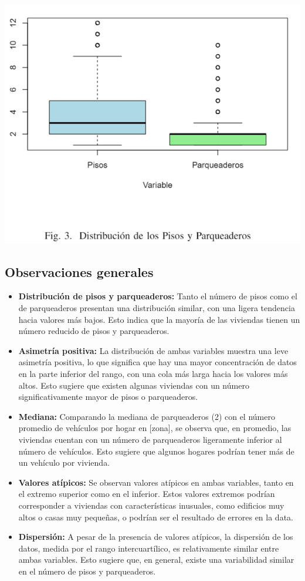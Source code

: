 \documentclass[conference,final,]{IEEEtran}
\begin{document}
\includegraphics[width=1\linewidth]{images/BoxplotViviendaParqueadero}

\subsection{\textbf{Observaciones generales}}

\begin{itemize}
\item
  \textbf{Distribución de pisos y parqueaderos:} Tanto el número de
  pisos como el de parqueaderos presentan una distribución similar, con
  una ligera tendencia hacia valores más bajos. Esto indica que la
  mayoría de las viviendas tienen un número reducido de pisos y
  parqueaderos.
\item
  \textbf{Asimetría positiva:} La distribución de ambas variables
  muestra una leve asimetría positiva, lo que significa que hay una
  mayor concentración de datos en la parte inferior del rango, con una
  cola más larga hacia los valores más altos. Esto sugiere que existen
  algunas viviendas con un número significativamente mayor de pisos o
  parqueaderos.
\item
  \textbf{Mediana:} Comparando la mediana de parqueaderos (2) con el
  número promedio de vehículos por hogar en {[}zona{]}, se observa que,
  en promedio, las viviendas cuentan con un número de parqueaderos
  ligeramente inferior al número de vehículos. Esto sugiere que algunos
  hogares podrían tener más de un vehículo por vivienda.
\item
  \textbf{Valores atípicos:} Se observan valores atípicos en ambas
  variables, tanto en el extremo superior como en el inferior. Estos
  valores extremos podrían corresponder a viviendas con características
  inusuales, como edificios muy altos o casas muy pequeñas, o podrían
  ser el resultado de errores en la data.
\item
  \textbf{Dispersión:} A pesar de la presencia de valores atípicos, la
  dispersión de los datos, medida por el rango intercuartílico, es
  relativamente similar entre ambas variables. Esto sugiere que, en
  general, existe una variabilidad similar en el número de pisos y
  parqueaderos.
\end{itemize}
\end{document}
